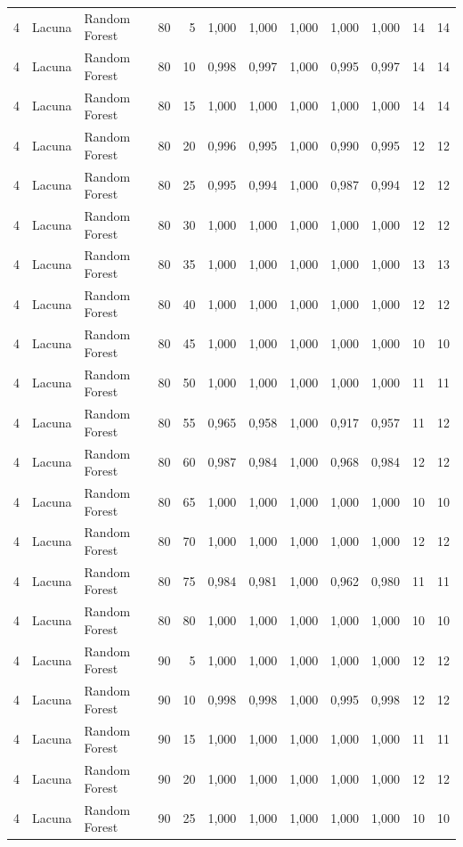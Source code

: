 \begin{longtable}{@{}rllrrrrrrrrr@{}}
4 & Lacuna & Random Forest & 80 & 5 & 1,000 & 1,000 & 1,000 & 1,000 & 1,000 & 14 & 14 \\
4 & Lacuna & Random Forest & 80 & 10 & 0,998 & 0,997 & 1,000 & 0,995 & 0,997 & 14 & 14 \\
4 & Lacuna & Random Forest & 80 & 15 & 1,000 & 1,000 & 1,000 & 1,000 & 1,000 & 14 & 14 \\
4 & Lacuna & Random Forest & 80 & 20 & 0,996 & 0,995 & 1,000 & 0,990 & 0,995 & 12 & 12 \\
4 & Lacuna & Random Forest & 80 & 25 & 0,995 & 0,994 & 1,000 & 0,987 & 0,994 & 12 & 12 \\
4 & Lacuna & Random Forest & 80 & 30 & 1,000 & 1,000 & 1,000 & 1,000 & 1,000 & 12 & 12 \\
4 & Lacuna & Random Forest & 80 & 35 & 1,000 & 1,000 & 1,000 & 1,000 & 1,000 & 13 & 13 \\
4 & Lacuna & Random Forest & 80 & 40 & 1,000 & 1,000 & 1,000 & 1,000 & 1,000 & 12 & 12 \\
4 & Lacuna & Random Forest & 80 & 45 & 1,000 & 1,000 & 1,000 & 1,000 & 1,000 & 10 & 10 \\
4 & Lacuna & Random Forest & 80 & 50 & 1,000 & 1,000 & 1,000 & 1,000 & 1,000 & 11 & 11 \\
4 & Lacuna & Random Forest & 80 & 55 & 0,965 & 0,958 & 1,000 & 0,917 & 0,957 & 11 & 12 \\
4 & Lacuna & Random Forest & 80 & 60 & 0,987 & 0,984 & 1,000 & 0,968 & 0,984 & 12 & 12 \\
4 & Lacuna & Random Forest & 80 & 65 & 1,000 & 1,000 & 1,000 & 1,000 & 1,000 & 10 & 10 \\
4 & Lacuna & Random Forest & 80 & 70 & 1,000 & 1,000 & 1,000 & 1,000 & 1,000 & 12 & 12 \\
4 & Lacuna & Random Forest & 80 & 75 & 0,984 & 0,981 & 1,000 & 0,962 & 0,980 & 11 & 11 \\
4 & Lacuna & Random Forest & 80 & 80 & 1,000 & 1,000 & 1,000 & 1,000 & 1,000 & 10 & 10 \\
4 & Lacuna & Random Forest & 90 & 5 & 1,000 & 1,000 & 1,000 & 1,000 & 1,000 & 12 & 12 \\
4 & Lacuna & Random Forest & 90 & 10 & 0,998 & 0,998 & 1,000 & 0,995 & 0,998 & 12 & 12 \\
4 & Lacuna & Random Forest & 90 & 15 & 1,000 & 1,000 & 1,000 & 1,000 & 1,000 & 11 & 11 \\
4 & Lacuna & Random Forest & 90 & 20 & 1,000 & 1,000 & 1,000 & 1,000 & 1,000 & 12 & 12 \\
4 & Lacuna & Random Forest & 90 & 25 & 1,000 & 1,000 & 1,000 & 1,000 & 1,000 & 10 & 10 \\

\end{longtable}

